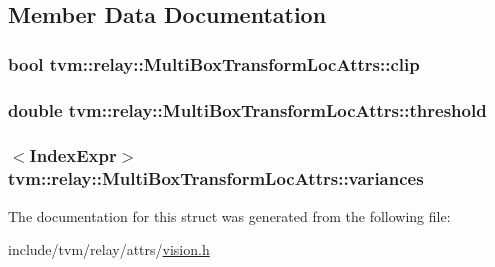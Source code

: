 \subsection{Member Data Documentation}
\subsubsection[{\texorpdfstring{clip}{clip}}]{\setlength{\rightskip}{0pt plus 5cm}bool tvm\+::relay\+::\+Multi\+Box\+Transform\+Loc\+Attrs\+::clip}\hypertarget{structtvm_1_1relay_1_1MultiBoxTransformLocAttrs_aa552a0e06f1c961277d8b65af07c841a}{}\label{structtvm_1_1relay_1_1MultiBoxTransformLocAttrs_aa552a0e06f1c961277d8b65af07c841a}
\subsubsection[{\texorpdfstring{threshold}{threshold}}]{\setlength{\rightskip}{0pt plus 5cm}double tvm\+::relay\+::\+Multi\+Box\+Transform\+Loc\+Attrs\+::threshold}\hypertarget{structtvm_1_1relay_1_1MultiBoxTransformLocAttrs_aad37e7285068b8ea93b27caaad5409d2}{}\label{structtvm_1_1relay_1_1MultiBoxTransformLocAttrs_aad37e7285068b8ea93b27caaad5409d2}
\subsubsection[{\texorpdfstring{variances}{variances}}]{$<${\bf Index\+Expr}$>$ tvm\+::relay\+::\+Multi\+Box\+Transform\+Loc\+Attrs\+::variances}\hypertarget{structtvm_1_1relay_1_1MultiBoxTransformLocAttrs_a77bebc24e0c21245de2620593c2c2272}{}\label{structtvm_1_1relay_1_1MultiBoxTransformLocAttrs_a77bebc24e0c21245de2620593c2c2272}


The documentation for this struct was generated from the following file\+:\begin{DoxyCompactItemize}
\item 
include/tvm/relay/attrs/\hyperlink{vision_8h}{vision.\+h}\end{DoxyCompactItemize}
